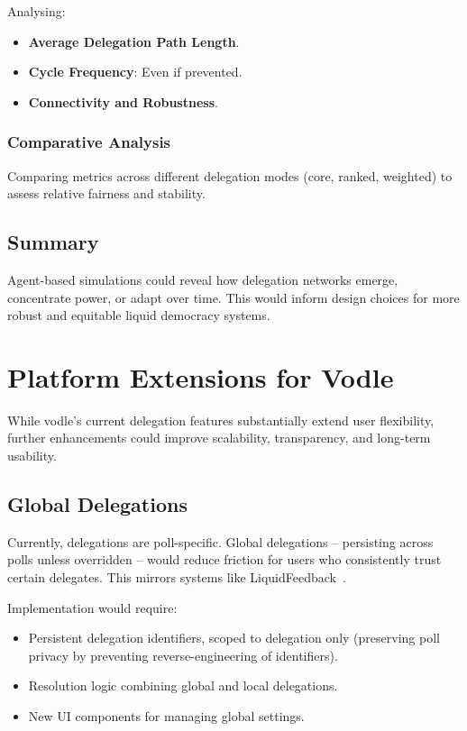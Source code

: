 Analysing:

\begin{itemize}
    \item \textbf{Average Delegation Path Length}.
    \item \textbf{Cycle Frequency}: Even if prevented.
    \item \textbf{Connectivity and Robustness}.
\end{itemize}

\subsubsection{Comparative Analysis}

Comparing metrics across different delegation modes (core, ranked, weighted) to assess relative fairness and stability.

\subsection{Summary}

Agent-based simulations could reveal how delegation networks emerge, concentrate power, or adapt over time. This would inform design choices for more robust and equitable liquid democracy systems.

\section{Platform Extensions for Vodle}

While vodle's current delegation features substantially extend user flexibility, further enhancements could improve scalability, transparency, and long-term usability.

\subsection{Global Delegations}

Currently, delegations are poll-specific. Global delegations -- persisting across polls unless overridden -- would reduce friction for users who consistently trust certain delegates. This mirrors systems like LiquidFeedback~\citep{behrens_liquidfeedback_2014}.

Implementation would require:

\begin{itemize}
    \item Persistent delegation identifiers, scoped to delegation only (preserving poll privacy by preventing reverse-engineering of identifiers).
    \item Resolution logic combining global and local delegations.
    \item New UI components for managing global settings.
\end{itemize}

